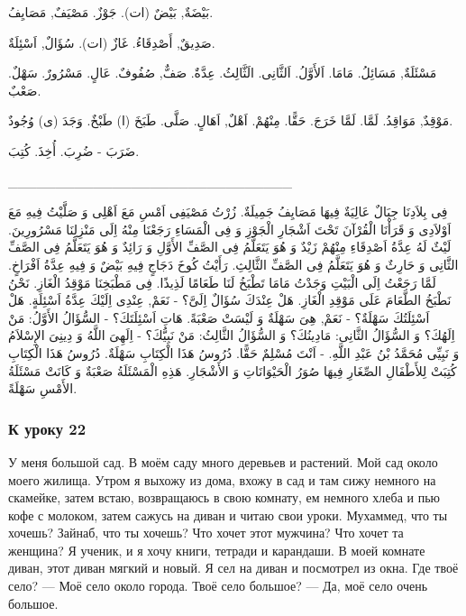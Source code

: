 \documentclass[a5paper]{article}
\begin{document}
بَيْضَةٌ, بَيْضٌ (ات). جَوْزٌ. مَصْيَفٌ, مَصَايِفُ. 

صَدِيقٌ, أَصْدِقَاءُ. غَازٌ (ات). سُؤَالٌ, اَسْئِلَةٌ. 

مَسْئَلَةٌ, مَسَائِلُ. مَامَا. اَلأَوَّلُ. اَلثَّانِى. الَثَّالِثُ. عِدَّةٌ. صَفٌّ, صُفُوفٌ. عَالٍ. مَسْرُورٌ. سَهْلٌ. صَعْبٌ. 

مَوْقِدٌ, مَوَاقِدُ. لَمَّا. لَمَّا خَرَجَ. حَقًّا. مِنْهُمْ. اَهْلٌ, اَهَالٍ. صَلَّى. طَبَخَ (ا) طَبْخٌ. وَجَدَ (ى) وُجُودٌ. 

ضَرَبَ - ضُرِبَ. أُخِذَ. كُتِبَ.

\_\_\_\_\_\_\_\_\_\_\_\_\_\_\_\_\_\_\_\_\_\_\_\_\_\_\_\_\_\_

فِى بِلاَدِنَا جِبَالٌ عَالِيَةٌ فِيهَا مَصَايِفُ جَمِيلَةٌ. زُرْتُ مَصْيَفِى اَمْسِ مَعَ اَهْلِى وَ صَلَّيْتُ فِيهِ مَعَ اَوْلاَدِى وَ قَرَأْنَا الْقُرْآنَ تَحْتَ اَشْجَارِ الْجَوْزِ وَ فِى الْمَسَاءِ رَجَعْنَا مِنْهُ اِلَى مَنْزِلِنَا مَسْرُورِينَ. لَيْثٌ لَهُ عِدَّةُ اَصْدِقَاءِ مِنْهُمْ زَيْدٌ وَ هُوَ يَتَعَلَّمُ فِى الصَّفِّ الأَوَّلِ وَ رَائِدٌ وَ هُوَ يَتَعَلَّمُ فِى الصَّفِّ الثَّانِى وَ حَارِثٌ وَ هُوَ يَتَعَلَّمُ فِى الصَّفِّ الثَّالِثِ. رَأَيْتُ كُوخَ دَجَاجٍ فِيهِ بَيْضٌ وَ فِيهِ عِدَّةُ اَفْرَاخٍ. لَمَّا رَجَعْتُ اِلَى الْبَيْتِ وَجَدْتُ مَامَا تَطْبَخُ لَنَا طَعَامًا لَذِيذًا. فِى مَطْبَخِنَا مَوْقِدُ الْغَازِ. نَحْنُ نَطْبَخُ الطَّعَامَ عَلَى مَوْقِدِ الْغَازِ. هَلْ عِنْدَكَ سُؤَالٌ اِلَىَّ؟ - نَعَمْ, عِنْدِى اِلَيْكَ عِدَّةُ اَسْئِلَةٍ. هَلْ اَسْئِلَتُكَ سَهْلَةٌ؟ - نَعَمْ, هِىَ سَهْلَةٌ وَ لَيْسَتْ صَعْبَةً. هَاتِ اَسْئِلَتَكَ؟ - السُّؤَالُ الأَوَّلُ: مَنْ اِلَهُكَ؟ وَ السُّؤَالُ الثَّانِى: مَادِينُكَ؟ وَ السُّؤَالُ الثَّالِثُ: مَنْ نَبِيُّكَ؟ - اِلَهِىَ اللَّهُ وَ دِينِىَ الإِسْلاَمُ وَ نَبِيِّى مُحَمَّدُ بْنُ عَبْدِ اللَّهِ. - اَنْتَ مُسْلِمٌ حَقًّا. دُرُوسُ هَذَا الْكِتَابِ سَهْلَةٌ. دُرُوسُ هَذَا الْكِتَابِ كُتِبَتْ لِلأَطْفَالِ الصِّغَارِ فِيهَا صُوَرُ الْحَيْوَانَاتِ وَ الأَشْجَارِ. هَذِهِ الْمَسْئَلَةُ صَعْبَةٌ وَ كَانَتْ مَسْئَلَةُ الأَمْسِ سَهْلَةً. 

\subsubsection{К уроку 22}
У меня большой сад. В моём саду много деревьев и растений. Мой сад около моего жилища. Утром я выхожу из дома, вхожу в сад и там сижу немного на скамейке, затем встаю, возвращаюсь в свою комнату, ем немного хлеба и пью кофе с молоком, затем сажусь на диван и читаю свои уроки. Мухаммед, что ты хочешь? Зайнаб, что ты хочешь? Что хочет этот мужчина? Что хочет та женщина? Я ученик, и я хочу книги, тетради и карандаши. В моей комнате диван, этот диван мягкий и новый. Я сел на диван и посмотрел из окна. Где твоё село? — Моё село около города. Твоё село большое? — Да, моё село очень большое.
\end{document}
